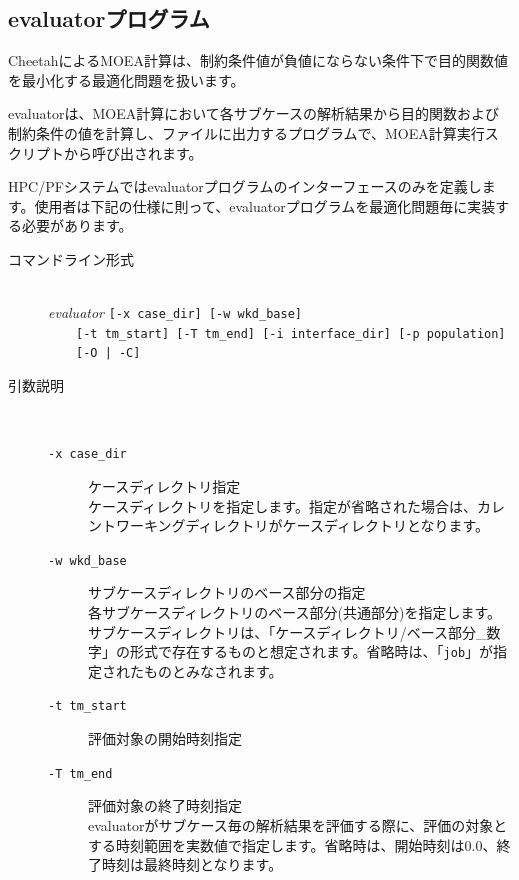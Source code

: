 \documentclass[a4paper,11pt]{jarticle}
\begin{document}
{\subsection{evaluatorプログラム}

CheetahによるMOEA計算は、制約条件値が負値にならない条件下で目的関数値を最小化する最適化問題を扱います。

evaluatorは、MOEA計算において各サブケースの解析結果から目的関数および制約条件の値を計算し、ファイルに出力するプログラムで、MOEA計算実行スクリプトから呼び出されます。

HPC/PFシステムではevaluatorプログラムのインターフェースのみを定義します。使用者は下記の仕様に則って、evaluatorプログラムを最適化問題毎に実装する必要があります。

\begin{description}
\item[コマンドライン形式] {\ }\\
\textit{evaluator} {\tt [-x case\_dir] [-w wkd\_base]}\\
\ \ \ \ {\tt [-t tm\_start] [-T tm\_end] [-i interface\_dir] [-p population]}\\
\ \ \ \ {\tt [-O | -C]}

\item[引数説明] {\ }\par
\begin{description}
\item[{\tt -x  case\_dir}] ケースディレクトリ指定\\
ケースディレクトリを指定します。指定が省略された場合は、カレントワーキングディレクトリがケースディレクトリとなります。\\

\item[{\tt -w  wkd\_base}] サブケースディレクトリのベース部分の指定\\
各サブケースディレクトリのベース部分(共通部分)を指定します。サブケースディレクトリは、「ケースディレクトリ/ベース部分\_数字」の形式で存在するものと想定されます。省略時は、「{\tt job}」が指定されたものとみなされます。\\

\item[{\tt -t  tm\_start}] 評価対象の開始時刻指定
\item[{\tt -T  tm\_end}] 評価対象の終了時刻指定\\
evaluatorがサブケース毎の解析結果を評価する際に、評価の対象とする時刻範囲を実数値で指定します。省略時は、開始時刻は0.0、終了時刻は最終時刻となります。\\


\end{description}
\end{description}}
\end{document}
